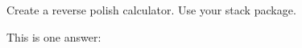 \begin{Exercise}[title={Calculator},difficulty=7]
\label{ex:calc}
\Question\label{ex:calc q1} Create a reverse polish calculator. Use your
stack package.

\end{Exercise}

\begin{Answer}
\Question This is one answer:


\end{Answer}
